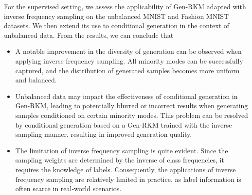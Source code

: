 For the supervised setting, we assess the applicability of Gen-RKM adapted with inverse frequency sampling on the unbalanced MNIST and Fashion MNIST datasets. We then extend its use to conditional generation in the context of unbalanced data. From the results, we can conclude that
\begin{itemize}[label={--}]
\item A notable improvement in the diversity of generation can be observed when applying inverse frequency sampling. All minority modes can be successfully captured, and the distribution of generated samples becomes more uniform and balanced.
\item Unbalanced data may impact the effectiveness of conditional generation in Gen-RKM, leading to potentially blurred or incorrect results when generating samples conditioned on certain minority modes. This problem can be resolved by conditional generation based on a Gen-RKM trained with the inverse sampling manner, resulting in improved generation quality.

\item The limitation of inverse frequency sampling is quite evident. Since the sampling weights are determined by the inverse of class frequencies, it requires the knowledge of labels. Consequently, the applications of inverse frequency sampling are relatively limited in practice, as label information is often scarce in real-world scenarios.
\end{itemize}

